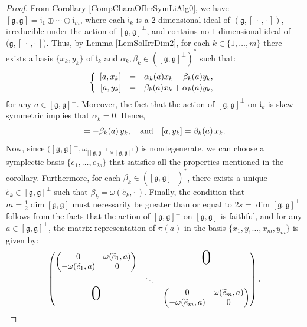 \documentclass[final,1p,times,nopreprintline]{elsarticle}
\theoremstyle{definition}
\numberwithin{equation}{section}
\newcommand{\w}{\omega}
\newcommand{\et}{\quad \textnormal{and}\quad}
\newcommand{\g}{\mathfrak{g}}
\numberwithin{equation}{section}
\newcommand{\ii}{\mathfrak{i}}
\newcommand{\cro}{[\,\cdot\,,\cdot\,]}
\begin{document}
\begin{proof}
	From Corollary \ref{CompCharaOfIrrSymLiAlg0}, we have $[\g,\g]=\ii_1\oplus\cdots\oplus\ii_m$, where each $\ii_k$ is a $2$-dimensional ideal of $(\g,\cro)$, irreducible under the action of $[\g,\g]^\perp$, and contains no $1$-dimensional ideal of $(\g,\cro$). Thus, by Lemma \ref{LemSolIrrDim2}, for each $k\in\{1,\ldots,m\}$ there exists a basis $\{x_k,y_k\}$ of $\ii_k$ and $\alpha_k,\beta_k\in\left([\g,\g]^\perp\right)^*$ such that:
	\begin{equation*}
		\left\{
		\begin{array}{r c l}\vspace{0.5mm}
			\left[a,x_k\right]&=&\alpha_k(a)x_k-\beta_k(a)y_k,\\ 
			\left[a,y_k\right]&=&\beta_k(a)x_k+\alpha_k(a)y_k,
		\end{array}
		\right.\\
	\end{equation*}
	for any $a\in[\g,\g]^\perp$. Moreover, the fact that the action of $[\g,\g]^\perp$ on $\ii_k$ is skew-symmetric implies that $\alpha_k=0$. Hence,
	\begin{equation*}
		[a,x_k]= -\beta_k(a)\,y_k,\et [a,y_k]= \beta_k(a)\,x_k.
	\end{equation*}  
	Now, since $\big([\g,\g]^\perp,\w_{|[\g,\g]^\perp\times [\g,\g]^\perp}\big)$ is nondegenerate, we can choose a symplectic basis $\{e_1,\ldots,e_{2s}\}$ that satisfies all the properties mentioned in the corollary. Furthermore, for each $\beta_k\in\left([\g,\g]^\perp\right)^*$, there exists a unique $\widetilde{e}_k\in[\g,\g]^\perp$ such that $\beta_k=\w(\widetilde{e}_k,\cdot\,)$. Finally, the condition that $m=\tfrac{1}{2}\dim[\g,\g]$ must necessarily be greater than or equal to $2s=\dim[\g,\g]^\perp$ follows from the facts that the action of $[\g,\g]^\perp$ on $[\g,\g]$ is faithful, and for any $a\in [\g,\g]^\perp$, the matrix representation of $\pi(a)$ in the basis $\{x_1,y_1\dots,x_m,y_m\}$ is given by:
	\begin{equation*}
		\begin{pmatrix}
			\begin{pmatrix}
				0&\w(\widetilde{e}_1,a)\\
				-\w(\widetilde{e}_1,a)&0
			\end{pmatrix}&&\text{\Huge0}\\
			&\ddots&\\
			\text{\Huge0}&&\begin{pmatrix}
				0&\w(\widetilde{e}_m,a)\\
				-\w(\widetilde{e}_m,a)&0
			\end{pmatrix}
		\end{pmatrix}.
	\end{equation*}
\end{proof}
\end{document}
